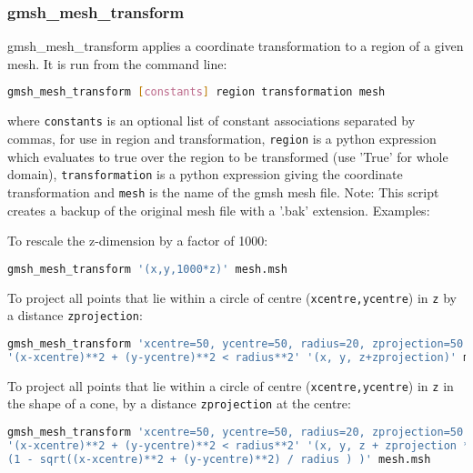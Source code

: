 
\subsubsection{gmsh\_mesh\_transform}
\label{sec:gmsh_mesh_transform}

gmsh\_mesh\_transform applies a coordinate transformation to a region of a given mesh. It is run from the command line:
\begin{lstlisting}[language = Bash]
gmsh_mesh_transform [constants] region transformation mesh
\end{lstlisting}
where \lstinline[language = Bash]+constants+ is an optional list of constant associations separated by commas, for use in region and transformation, \lstinline[language = Bash]+region+ is a python expression which evaluates to true over the region to be transformed (use 'True' for whole domain), \lstinline[language = Bash]+transformation+ is a python expression giving the coordinate transformation and \lstinline[language = Bash]+mesh+ is the name of the gmsh mesh file.
Note: This script creates a backup of the original mesh file with a '.bak' extension.
Examples:

To rescale the z-dimension by a factor of 1000:
\begin{lstlisting}[language = Bash]
gmsh_mesh_transform '(x,y,1000*z)' mesh.msh
\end{lstlisting} 

To project all points that lie within a circle of centre (\lstinline[language = Bash]+xcentre,ycentre+) in \lstinline[language = Bash]+z+ by a distance \lstinline[language = Bash]+zprojection+:
\begin{lstlisting}[language = Bash]
gmsh_mesh_transform 'xcentre=50, ycentre=50, radius=20, zprojection=50'
'(x-xcentre)**2 + (y-ycentre)**2 < radius**2' '(x, y, z+zprojection)' mesh.msh
\end{lstlisting} 

To project all points that lie within a circle of centre (\lstinline[language = Bash]+xcentre,ycentre+) in \lstinline[language = Bash]+z+ in the shape of a cone, by a distance \lstinline[language = Bash]+zprojection+ at the centre:
\begin{lstlisting}[language = Bash]
gmsh_mesh_transform 'xcentre=50, ycentre=50, radius=20, zprojection=50'
'(x-xcentre)**2 + (y-ycentre)**2 < radius**2' '(x, y, z + zprojection *
(1 - sqrt((x-xcentre)**2 + (y-ycentre)**2) / radius ) )' mesh.msh
\end{lstlisting} 

